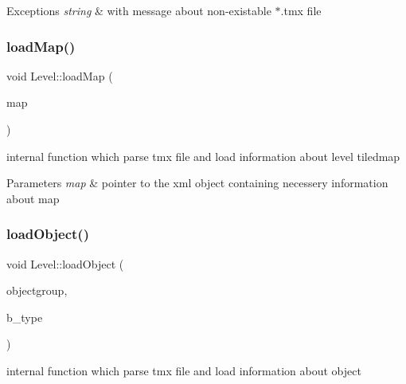 \begin{DoxyExceptions}{Exceptions}
{\em string} & with message about non-\/existable $\ast$.tmx file \\
\hline
\end{DoxyExceptions}
\mbox{\label{class_level_ac95aee215b31865a7f010d077e9e59b8}} 
\subsubsection{\texorpdfstring{load\+Map()}{loadMap()}}
{\footnotesize\ttfamily void Level\+::load\+Map (\begin{DoxyParamCaption}\item[{tinyxml2\+::\+X\+M\+L\+Element $\ast$}]{map }\end{DoxyParamCaption})\hspace{0.3cm}{\ttfamily [private]}}



internal function which parse tmx file and load information about level tiledmap 


\begin{DoxyParams}{Parameters}
{\em map} & pointer to the xml object containing necessery information about map \\
\hline
\end{DoxyParams}
\mbox{\label{class_level_a69835ba3b93667d000f1bd7feece7217}} 
\subsubsection{\texorpdfstring{load\+Object()}{loadObject()}}
{\footnotesize\ttfamily void Level\+::load\+Object (\begin{DoxyParamCaption}\item[{tinyxml2\+::\+X\+M\+L\+Element $\ast$}]{objectgroup,  }\item[{\hyperlink{_level_8h_acf0ce63e34327e5bc336f9fe3d2d47a2}{Body\+Type}}]{b\+\_\+type }\end{DoxyParamCaption})\hspace{0.3cm}{\ttfamily [private]}}



internal function which parse tmx file and load information about object 


